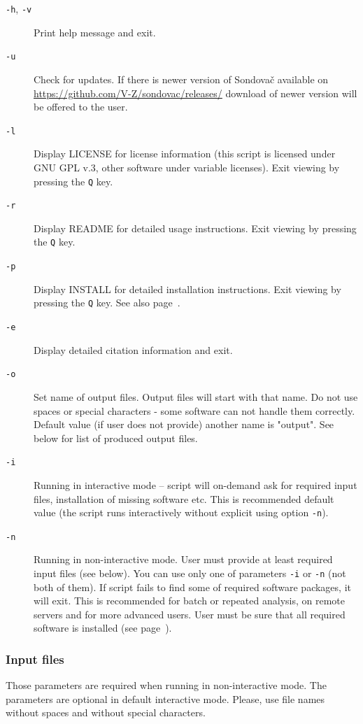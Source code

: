\documentclass[a4paper, 11pt, twoside]{article}
\begin{document}
\begin{description}
  \item[\texttt{-h}, \texttt{-v}] Print help message and exit.
  \item[\texttt{-u}] Check for updates. If there is newer version of Sondovač available on \href{https://github.com/V-Z/sondovac/releases/}{https://github.com/V-Z/sondovac/releases/} download of newer version will be offered to the user.
  \item[\texttt{-l}] Display LICENSE for license information (this script is licensed under GNU GPL v.3, other software under variable licenses). Exit viewing by pressing the \texttt{Q} key.
  \item[\texttt{-r}] Display README for detailed usage instructions. Exit viewing by pressing the \texttt{Q} key.
  \item[\texttt{-p}] Display INSTALL for detailed installation instructions. Exit viewing by pressing the \texttt{Q} key. See also page~\pageref{install}.
  \item[\texttt{-e}] Display detailed citation information and exit.
  \item[\texttt{-o}] Set name of output files. Output files will start with that name. Do not use spaces or special characters - some software can not handle them correctly. Default value (if user does not provide) another name is "output". See below for list of produced output files.
  \item[\texttt{-i}] Running in interactive mode -- script will on-demand ask for required input files, installation of missing software etc. This is recommended default value (the script runs interactively without explicit using option \texttt{-n}).
  \item[\texttt{-n}] Running in non-interactive mode. User must provide at least required input files (see below). You can use only one of parameters \texttt{-i} or \texttt{-n} (not both of them). If script fails to find some of required software packages, it will exit. This is recommended for batch or repeated analysis, on remote servers and for more advanced users. User must be sure that all required software is installed (see page~\pageref{install}).
\end{description}

\subsubsection{Input files}

Those parameters are required when running in non-interactive mode. The parameters are optional in default interactive mode. Please, use file names without spaces and without special characters.
\end{document}
